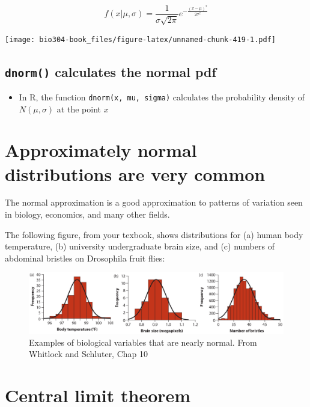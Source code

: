\documentclass[]{book}
\providecommand{\tightlist}{%
  \setlength{\itemsep}{0pt}\setlength{\parskip}{0pt}}
\theoremstyle{definition}
\theoremstyle{definition}
\theoremstyle{definition}
\theoremstyle{remark}
\begin{document}
\[
f(x|\mu,\sigma) = \frac{1}{\sigma\sqrt{2\pi}}e^{-\frac{(x-\mu)^2}{2\sigma^2}}
\]

\texttt{[image: bio304-book\_files/figure-latex/unnamed-chunk-419-1.pdf]}

\hypertarget{dnorm-calculates-the-normal-pdf}{%
\subsection{\texorpdfstring{\texttt{dnorm()} calculates the normal
pdf}{dnorm() calculates the normal pdf}}\label{dnorm-calculates-the-normal-pdf}}

\begin{itemize}
\tightlist
\item
  In R, the function \texttt{dnorm(x,\ mu,\ sigma)} calculates the
  probability density of \(N(\mu,\sigma)\) at the point \(x\)
\end{itemize}

\hypertarget{approximately-normal-distributions-are-very-common}{%
\section{Approximately normal distributions are very
common}\label{approximately-normal-distributions-are-very-common}}

The normal approximation is a good approximation to patterns of
variation seen in biology, economics, and many other fields.

The following figure, from your texbook, shows distributions for (a)
human body temperature, (b) university undergraduate brain size, and (c)
numbers of abdominal bristles on Drosophila fruit flies:

\begin{figure}

{\centering \includegraphics[width=0.9\linewidth]{./figures/fig-normals-horiz} 

}

\caption{Examples of biological variables that are nearly normal. From Whitlock and Schluter, Chap 10}\label{fig:unnamed-chunk-420}
\end{figure}

\hypertarget{central-limit-theorem}{%
\section{Central limit theorem}\label{central-limit-theorem}}
\end{document}
